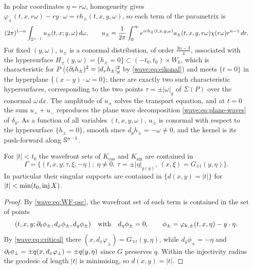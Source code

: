 \begin{remark}\label{wave:rem:superposition}
In polar coordinates $\eta=r\omega$, homogeneity gives
$\varphi_{\pm}(t,x,r\omega)-ry\cdot\omega=rh_\pm(t,x,y,\omega)$, so each term of the parametrix is
\begin{equation*}
(2\pi)^{1-n}\int_{\mathbb{S}^{n-1}}u_\pm(t,x;y,\omega)\,d\omega,\qquad
u_\pm=\frac1{2\pi}\int_0^\infty e^{irh_\pm(t,x,y,\omega)}a_\pm(t,x,y,r\omega)\chi(r\omega)r^{n-1}\,dr .
\end{equation*}
For fixed $(y,\omega)$, $u_\pm$ is a conormal distribution, of order $\frac{3n-3}4$, associated
with the hypersurface $H_\pm(y,\omega)=\{h_\pm=0\}\subset(-t_0,t_0)\times W_k$, which is
characteristic for $P$ ($(\partial_th_\pm)^2=|d_xh_\pm|_g^2$ by \eqref{wave:eq:eikonal}) and
meets $\{t=0\}$ in the hyperplane $\{(x-y)\cdot\omega=0\}$; there are exactly two such
characteristic hypersurfaces, corresponding to the two points $\tau=\pm|\omega|_g$ of
$\Sigma(P)$ over the conormal $\omega\,dx$. The amplitude of $u_\pm$ solves the transport
equation, and at $t=0$ the sum $u_++u_-$ reproduces the plane wave decomposition
\eqref{wave:eq:plane-waves} of $\delta_y$. As a function of all variables
$(t,x,y,\omega)$, $u_\pm$ is conormal with respect to the hypersurface
$\{h_\pm=0\}$, smooth since $d_yh_\pm=-\omega\ne0$, and the kernel is its push-forward
along $\mathbb{S}^{n-1}$.
\end{remark}

\begin{corollary}\label{wave:cor:WF-short}
For $|t|<t_0$ the wavefront sets of $K_{\cos}$ and $K_{\sin}$ are contained in
\begin{equation*}
\Gamma=\big\{(t,x,y;\tau,\xi,-\eta);\ \eta\ne0,\ \tau=\pm|\eta|_{g(y)},\ (x,\xi)=G_{\mp t}(y,\eta)\big\}.
\end{equation*}
In particular their singular supports are contained in $\{d(x,y)=|t|\}$ for
$|t|<\min(t_0,\operatorname{inj} X)$.
\end{corollary}
\begin{proof}
By \eqref{wave:eq:WF-osc}, the wavefront set of each term is contained in the set
of points
\begin{equation*}
(t,x,y;\partial_t\phi_\pm,d_x\phi_\pm,d_y\phi_\pm)\quad\text{with}\quad d_\eta\phi_\pm=0,\qquad \phi_\pm=\varphi_{k,\pm}(t,x,\eta)-y\cdot\eta .
\end{equation*}
By \eqref{wave:eq:critical} there $(x,d_x\varphi_\pm)=G_{\mp t}(y,\eta)$, while
$d_y\phi_\pm=-\eta$ and $\partial_t\phi_\pm=\pm q(x,d_x\varphi_\pm)=\pm q(y,\eta)$ since $G$
preserves $q$. Within the injectivity radius the geodesic of length $|t|$ is
minimising, so $d(x,y)=|t|$.
\end{proof}

